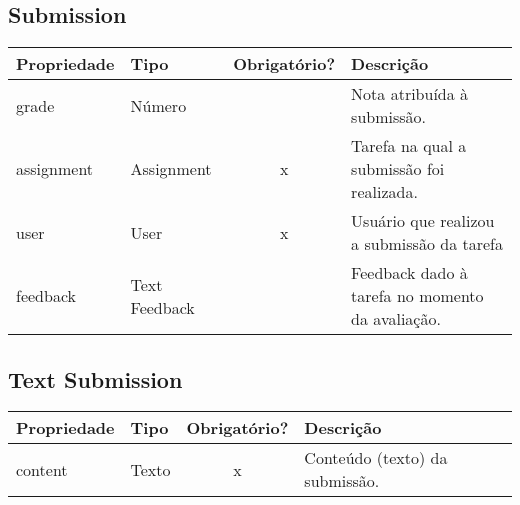 \subsection{Submission} \label{Submission}
\begin{table}[H]
	\footnotesize
	\begin{tabularx}{\textwidth}{|X|X|c|p{7.8cm}|}   \hline \rowcolor[rgb]{0.8,0.8,0.8}
		
		\textbf{Propriedade} & \textbf{Tipo} & \textbf{Obrigatório?} & \centerline{\textbf{Descrição}} \\\hline  	
		
		grade & Número & {} & Nota atribuída à submissão. \\\hline	
		assignment & Assignment & x & Tarefa na qual a submissão foi realizada. \\\hline
		user & User & x & Usuário que realizou a submissão da tarefa \\\hline
		feedback & Text Feedback & {} & Feedback dado à tarefa no momento da avaliação. \\\hline			
		
	\end{tabularx}	
\end{table}


\subsection{Text Submission} \label{Text Submission}
\begin{table}[H]
	\footnotesize
	\begin{tabularx}{\textwidth}{|X|X|c|p{7.8cm}|}   \hline \rowcolor[rgb]{0.8,0.8,0.8}
		
		\textbf{Propriedade} & \textbf{Tipo} & \textbf{Obrigatório?} & \centerline{\textbf{Descrição}} \\\hline  	
		
		content & Texto & x & Conteúdo (texto) da submissão. \\\hline				
		
	\end{tabularx}	
\end{table}


